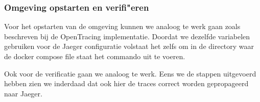 \subsubsection{Omgeving opstarten en verifi"eren}
Voor het opstarten van de omgeving kunnen we analoog te werk gaan zoals beschreven bij de OpenTracing implementatie. Doordat we dezelfde variabelen gebruiken voor de Jaeger configuratie volstaat het zelfs om in de directory waar de docker compose file staat het commando  uit te voeren.

Ook voor de verificatie gaan we analoog te werk. Eens we de stappen uitgevoerd hebben zien we inderdaad dat ook hier de traces correct worden gepropageerd naar Jaeger.